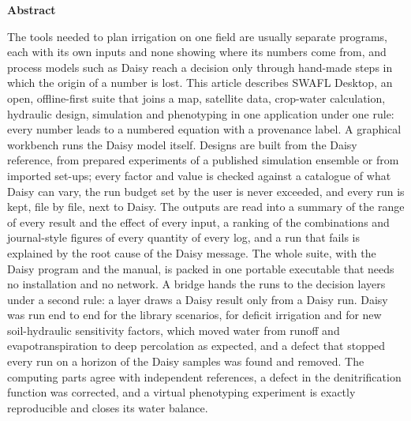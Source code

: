 

\linenumbers
\begin{titlepage}
\vspace*{-1.2cm}
\begin{center}\begin{minipage}{0.92\textwidth}\end{minipage}\end{center}
\vspace{0.4cm}
\authorblock
\vspace{0.4cm}
{\small\setlength{\parindent}{0pt}\setlength{\parskip}{0pt}
\begin{center}\textbf{\normalsize Abstract}\end{center}\vspace{-0.4em}
\noindent The tools needed to plan irrigation on one field are usually separate programs, each with its own inputs and none showing where its numbers come from, and process models such as Daisy reach a decision only through hand-made steps in which the origin of a number is lost. This article describes SWAFL Desktop, an open, offline-first suite that joins a map, satellite data, crop-water calculation, hydraulic design, simulation and phenotyping in one application under one rule: every number leads to a numbered equation with a provenance label. A graphical workbench runs the Daisy model itself. Designs are built from the Daisy reference, from prepared experiments of a published simulation ensemble or from imported set-ups; every factor and value is checked against a catalogue of what Daisy can vary, the run budget set by the user is never exceeded, and every run is kept, file by file, next to Daisy. The outputs are read into a summary of the range of every result and the effect of every input, a ranking of the combinations and journal-style figures of every quantity of every log, and a run that fails is explained by the root cause of the Daisy message. The whole suite, with the Daisy program and the manual, is packed in one portable executable that needs no installation and no network. A bridge hands the runs to the decision layers under a second rule: a layer draws a Daisy result only from a Daisy run. Daisy was run end to end for the library scenarios, for deficit irrigation and for new soil-hydraulic sensitivity factors, which moved water from runoff and evapotranspiration to deep percolation as expected, and a defect that stopped every run on a horizon of the Daisy samples was found and removed. The computing parts agree with independent references, a defect in the denitrification function was corrected, and a virtual phenotyping experiment is exactly reproducible and closes its water balance.

}
\end{titlepage}
